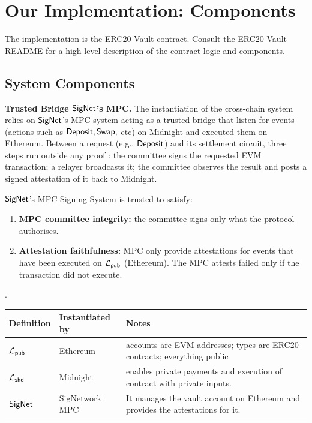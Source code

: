 \section{Our Implementation: Components}
\label{sec:components}

The implementation is the ERC20 Vault contract.  Consult the \href{\analysedReadmeUrl}{ERC20 Vault README}  for a
high-level description of the contract logic and components.


\subsection{System Components}
\noindent
\textbf{Trusted Bridge $\mathsf{SigNet}$'s MPC.}
The instantiation of the cross-chain system relies on $\mathsf{SigNet}$'s MPC system acting as
a trusted bridge that listen for events (actions such as $\mathsf{Deposit},\mathsf{Swap},$ etc) on  Midnight
and executed them on Ethereum.
Between a request   (e.g., $\mathsf{Deposit}$) and its
settlement  circuit, three steps run outside any proof : the committee signs the requested EVM transaction;
a relayer broadcasts it; the committee observes the result and posts a signed attestation of it back
to Midnight.


$\mathsf{SigNet}$'s MPC  Signing System  is trusted to satisfy:
    \begin{enumerate}
        \item  \textbf{MPC committee integrity:}  the committee signs only what the protocol authorises.
        \item \textbf{Attestation faithfulness:}  MPC only provide attestations for events that have been executed on $\mathcal{L}_{\mathsf{pub}}$ (Ethereum). The MPC attests failed only if the transaction did not execute.
    \end{enumerate}.

\begin{center}
\begin{tabular}{@{}L{2.7cm}L{5.4cm}L{6.3cm}@{}}
\toprule
\textbf{Definition} & \textbf{Instantiated by} & \textbf{Notes} \\
\midrule
$\mathcal{L}_{\mathsf{pub}}$ &  Ethereum & accounts are EVM addresses; types are ERC20
  contracts; everything public \\
  \midrule
$\mathcal{L}_{\mathsf{shd}}$ & Midnight  &  enables private payments  and execution of contract with private inputs.\\
\midrule
$\mathsf{SigNet}$  & SigNetwork MPC &  It manages the vault account on Ethereum and provides the attestations for it.\\
\bottomrule
\end{tabular}
\end{center}



